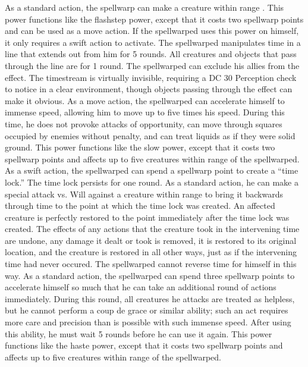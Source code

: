 \norepeatnotes
{} As a standard action, the spellwarp can make a creature within \rngmed range \slowed.
 This power functions like the flashstep power, except that it costs two spellwarp points and can be used as a move action. If the spellwarped uses this power on himself, it only requires a swift action to activate.
 The spellwarped manipulates time in a \arealarge line that extends out from him for 5 rounds. All creatures and objects that pass through the line are \slowed for 1 round. The spellwarped can exclude his allies from the effect. The timestream is virtually invisible, requiring a DC 30 Perception check to notice in a clear environment, though objects passing through the effect can make it obvious.
 As a move action, the spellwarped can accelerate himself to immense speed, allowing him to move up to five times his speed. During this time, he does not provoke attacks of opportunity, can move through squares occupied by enemies without penalty, and can treat liquids as if they were solid ground.
 This power functions like the slow power, except that it costs two spellwarp points and affects up to five creatures within \rngclose range of the spellwarped.
 As a swift action, the spellwarped can spend a spellwarp point to create a ``time lock.'' The time lock persists for one round. As a standard action, he can make a special attack vs. Will against a creature within \rngmed range to bring it backwards through time to the point at which the time lock was created. An affected creature is perfectly restored to the point immediately after the time lock was created. The effects of any actions that the creature took in the intervening time are undone, any damage it dealt or took is removed, it is restored to its original location, and the creature is restored in all other ways, just as if the intervening time had never occured. The spellwarped cannot reverse time for himself in this way.
 As a standard action, the spellwarped can spend three spellwarp points to accelerate himself so much that he can take an additional round of actions immediately. During this round, all creatures he attacks are treated as helpless, but he cannot perform a coup de grace or similar ability; such an act requires more care and precision than is possible with such immense speed. After using this ability, he must wait 5 rounds before he can use it again.
 This power functions like the haste power, except that it costs two spellwarp points and affects up to five creatures within \rngclose range of the spellwarped.
